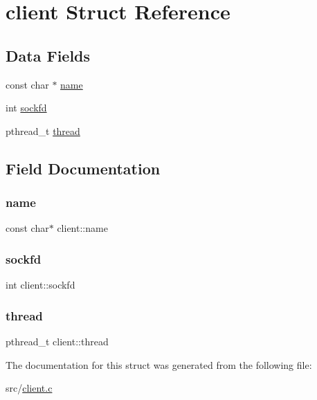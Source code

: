 \hypertarget{structclient}{}\section{client Struct Reference}
\label{structclient}
\subsection*{Data Fields}
\begin{DoxyCompactItemize}
\item 
const char $\ast$ \hyperlink{structclient_a99f435ea140a038c3be5e2ab49aa43aa}{name}
\item 
int \hyperlink{structclient_ab7c05dd7a1a5daa5383849d8b3b0ce3f}{sockfd}
\item 
pthread\+\_\+t \hyperlink{structclient_a529fa20e309347262616a00ad0ad3d93}{thread}
\end{DoxyCompactItemize}


\subsection{Field Documentation}
\mbox{\label{structclient_a99f435ea140a038c3be5e2ab49aa43aa}} 
\subsubsection{\texorpdfstring{name}{name}}
{\footnotesize\ttfamily const char$\ast$ client\+::name}

\mbox{\label{structclient_ab7c05dd7a1a5daa5383849d8b3b0ce3f}} 
\subsubsection{\texorpdfstring{sockfd}{sockfd}}
{\footnotesize\ttfamily int client\+::sockfd}

\mbox{\label{structclient_a529fa20e309347262616a00ad0ad3d93}} 
\subsubsection{\texorpdfstring{thread}{thread}}
{\footnotesize\ttfamily pthread\+\_\+t client\+::thread}



The documentation for this struct was generated from the following file\+:\begin{DoxyCompactItemize}
\item 
src/\hyperlink{client_8c}{client.\+c}\end{DoxyCompactItemize}
